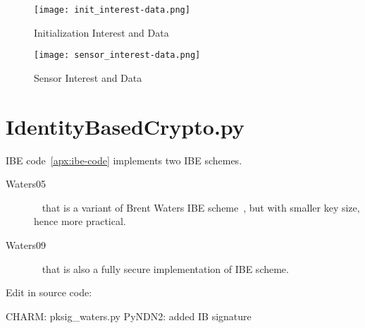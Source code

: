\begin{figure}[ht]
  \centering
  \texttt{[image: init\_interest-data.png]}
  \caption{Initialization Interest and Data}
  \label{fig:init_interest-data}
\end{figure}

\begin{figure}[ht]
  \centering
  \texttt{[image: sensor\_interest-data.png]}
  \caption{Sensor Interest and Data}
  \label{fig:sensor_interest-data}
\end{figure}

\section{IdentityBasedCrypto.py}
\gls{IBE} code~\autoref{apx:ibe-code} implements two \gls{IBE} schemes.

\begin{description}
  \item[Waters05]~\cite{DBLP:journals/iacr/Naccache05} that is a variant of Brent Waters \gls{IBE} scheme~\cite{DBLP:journals/iacr/Waters04}, but with smaller key size, hence more practical.
  \item[Waters09]~\cite{DBLP:conf/crypto/Waters09} that is also a fully secure implementation of \gls{IBE} scheme.
\end{description}


Edit in source code:

CHARM: pksig_waters.py
PyNDN2: added IB signature